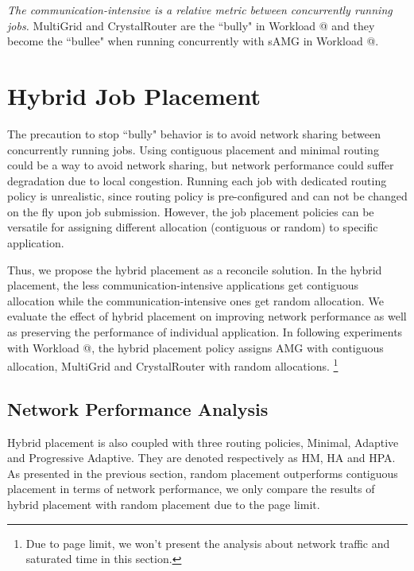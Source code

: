 \documentclass[conference,compsoc]{IEEEtran}
\makeatletter
\newcommand{\Rmnum}[1]{\expandafter\@slowromancap\romannumeral #1@}
\makeatother
\begin{document}
\emph{The communication-intensive is a relative metric between concurrently running jobs.} MultiGrid and CrystalRouter are the ``bully" in Workload \Rmnum{1} and they become the ``bullee" when running concurrently with sAMG in Workload \Rmnum{2}.


\section{Hybrid Job Placement}
\label{sec: hybrid placement}

The precaution to stop ``bully" behavior is to avoid network sharing between concurrently running jobs. Using contiguous placement and minimal routing could be a way to avoid network sharing, but network performance could suffer degradation due to local congestion. Running each job with dedicated routing policy is unrealistic, since routing policy is pre-configured and can not be changed on the fly upon job submission. However, the job placement policies can be versatile for assigning different allocation (contiguous or random) to specific application.

Thus, we propose the hybrid placement as a reconcile solution. In the hybrid placement, the less communication-intensive applications get contiguous allocation while the communication-intensive ones get random allocation. We evaluate the effect of hybrid placement on improving network performance as well as preserving the performance of individual application. In following experiments with Workload \Rmnum{1}, the hybrid placement policy assigns AMG with contiguous allocation, MultiGrid and CrystalRouter with random allocations. \footnote{Due to page limit, we won't present the analysis about network traffic and saturated time in this section.}

\subsection{Network Performance Analysis}

Hybrid placement is also coupled with three routing policies, Minimal, Adaptive and Progressive Adaptive. They are denoted respectively as HM, HA and HPA. As presented in the previous section, random placement outperforms contiguous placement in terms of network performance, we only compare the results of hybrid placement with random placement due to the page limit.
\end{document}
